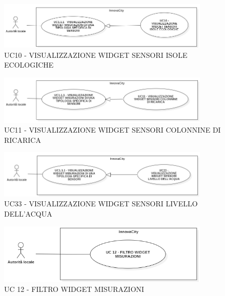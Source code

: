 
\newpage

\begin{figure}[H]
    \centering
    \includegraphics[width=0.9\textwidth]{../Images/uc10.png}
    \caption{UC10 - VISUALIZZAZIONE WIDGET SENSORI ISOLE ECOLOGICHE }
\end{figure}


\begin{figure}[H]
    \centering
    \includegraphics[width=0.9\textwidth]{../Images/uc11.PNG}
    \caption{UC11 - VISUALIZZAZIONE WIDGET SENSORI COLONNINE DI RICARICA }
\end{figure}




\begin{figure}[H]
    \centering
    \includegraphics[width=0.9\textwidth]{../Images/uc33.PNG}
    \caption{UC33 - VISUALIZZAZIONE WIDGET SENSORI LIVELLO DELL'ACQUA }
\end{figure}



\newpage

\begin{figure}[H]
    \centering
    \includegraphics[width=0.9\textwidth]{../Images/uc12.PNG}
    \caption{UC 12 - FILTRO WIDGET MISURAZIONI }
\end{figure}

